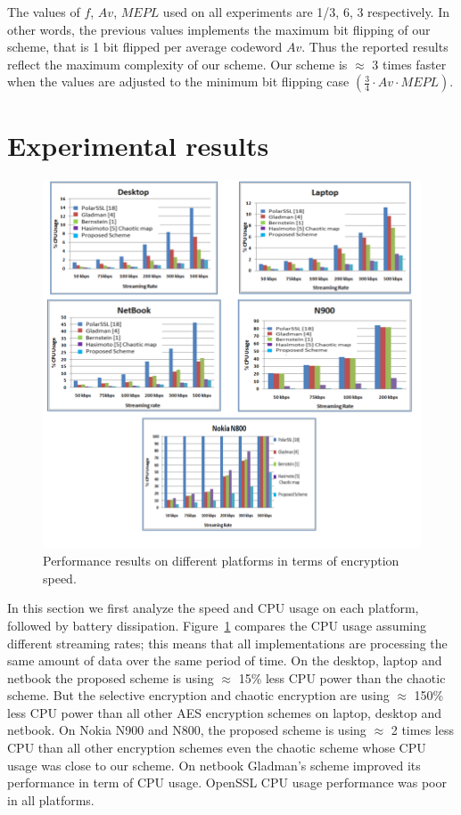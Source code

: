 \documentclass[preprint]{elsarticle}
\begin{document}
The values of $f$, $Av$, $MEPL$ used on all experiments are 1/3, 6, 3 respectively. In other words, the previous values implements the maximum bit flipping of our scheme, that is 1 bit flipped per average codeword $Av$. Thus the reported results reflect the maximum complexity of our scheme. Our scheme is $\approx$ 3 times faster when the values are adjusted to the minimum bit flipping case $(\frac{3}{4} \cdot Av \cdot MEPL)$.

\section{Experimental results}
\label{experimentalResults}


\begin{figure}[!ht]
\centering
\includegraphics[width=\textwidth]{figure7.png}
\caption{Performance results on different platforms in terms of encryption speed.}
\label{f7}
\end{figure} 

In this section we first analyze the speed and CPU usage on each platform, followed by battery dissipation. Figure~\ref{f7} compares the CPU usage assuming different streaming rates; this means that all implementations are processing the same amount of data over the same period of time. On the desktop, laptop and netbook the proposed scheme is using $\approx$ 15\% less CPU power than the chaotic scheme. But the selective encryption and chaotic encryption are using $\approx$ 150\% less CPU power than all other AES encryption schemes on laptop, desktop and netbook. On Nokia N900 and N800, the proposed scheme is using $\approx$ 2 times less CPU than all other encryption schemes even the chaotic scheme whose CPU usage was close to our scheme. On netbook Gladman's scheme improved its performance in term of CPU usage. OpenSSL CPU usage performance was poor in all platforms.
\end{document}

